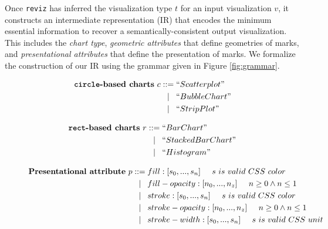 \documentclass[acmsmall,screen,nonacm]{acmart}
\newcommand{\code}[1]{\texttt{#1}}
\newcommand{\sis}{%
  ::=
}
\newcommand{\sor}{%
  \mathrel{\makebox[\widthof{$\sis$}]{$|$}}%
}
\begin{document}
Once \code{reviz} has inferred the visualization type $t$ for an input visualization $v$, it constructs an intermediate representation (IR) that encodes the minimum essential information to recover a semantically-consistent output visualization. This includes the \emph{chart type}, \emph{geometric attributes} that define geometries of marks, and \emph{presentational attributes} that define the presentation of marks. We formalize the construction of our IR using the grammar given in Figure \ref{fig:grammar}.

\begin{figure}
  \begin{minipage}[t]{0.45\textwidth}
    \begin{align*}
      \textbf{\code{circle}-based charts}~c
      &\sis ``Scatterplot" \\
      &\sor ``BubbleChart" \\
      &\sor ``StripPlot"
    \end{align*}
  \end{minipage}
  \begin{minipage}[t]{0.45\textwidth}
    \begin{align*}
      \textbf{\code{rect}-based charts}~r
      &\sis ``BarChart" \\
      &\sor ``StackedBarChart" \\
      &\sor ``Histogram"
    \end{align*}
  \end{minipage}
  \begin{minipage}[t]{0.9\textwidth}
    \begin{align*}
      \textbf{Presentational attribute}~p
      &\sis fill: [s_0, ..., s_n] \hspace{5mm} s~is~valid~CSS~color \\
      &\sor fill-opacity: [n_0, ..., n_z] \hspace{5mm} n \geq 0 \land n \leq 1  \\
      &\sor stroke: [s_0, ..., s_n] \hspace{5mm} s~is~valid~CSS~color \\
      &\sor stroke-opacity: [n_0, ..., n_z] \hspace{5mm} n \geq 0 \land n \leq 1 \\
      &\sor stroke-width: [s_0, ..., s_n] \hspace{5mm} s~is~valid~CSS~unit
     \end{align*}
  \end{minipage}
  \begin{minipage}[t]{0.4\textwidth}

\end{minipage}
\end{figure}
\end{document}
